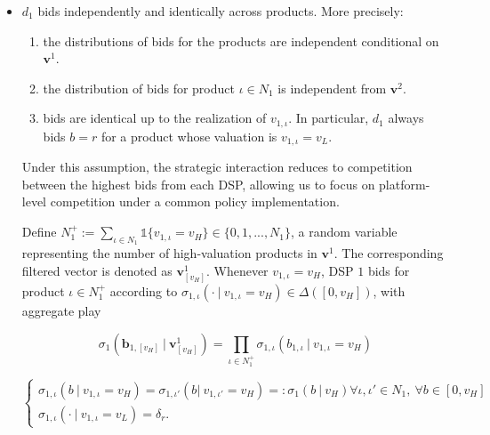 \begin{itemize}
    \item $ d_1 $ bids independently and identically across products. More precisely:

    \begin{enumerate}[(1)]

        \item the distributions of bids for the products are independent conditional on $ \bm{v}^1 $.

        

        \item the distribution of bids for product $ \iota \in N_1 $ is independent from $ \bm{v}^{2} $.

        

        \item bids are identical up to the realization of $ v_{1,\iota} $. In particular, $ d_1 $ always bids $ b = r $ for a product whose valuation is $ v_{1,\iota} = v_L $.

    \end{enumerate}

    

\noindent Under this assumption, the strategic interaction reduces to competition between the highest bids from each DSP, allowing us to focus on platform-level competition under a common policy implementation.

    

    \noindent Define $N_1^+ := \sum_{\iota \in N_1}\mathbb{1}\{v_{1,\iota} = v_H\} \in \{0, 1, ..., N_1\}$, a random variable representing the number of high-valuation products in $\bm{v}^1$. The corresponding filtered vector is denoted as $\bm{v}^1_{[v_H]}$. Whenever $v_{1,\iota} = v_H$, DSP $ 1 $ bids for product $ \iota \in N_1^+ $ according to $ \sigma_{1,\iota} ( \cdot \ | \ v_{1,\iota} = v_H) \in \Delta([0,v_H]) $, with aggregate play

    \begin{equation*}\tag{I $\cap$ II}\label{indep}
     \sigma_1 \left(\bm{b}_{1, [v_H]}\ \Big| \ \bm{v}^1_{[v_H]}\right) = \prod_{\iota \in N_1^+} \sigma_{1, \iota} (b_{1,\iota}\ | \ v_{1,\iota} = v_H)
    \end{equation*}

    \begin{equation*}\tag{III}\label{ident} 
        \begin{cases}
          \sigma_{1,\iota} (b \ | \ v_{1,\iota} = v_H) = \sigma_{1,\iota'} (b | \ v_{1,\iota'} = v_H) =: \sigma_1 (b \ | \ v_H)   \forall \iota, \iota' \in N_1, \ \forall b \in [0,v_H] \\[5pt]
          \sigma_{1,\iota} ( \cdot \ | \ v_{1,\iota} = v_L) = \delta_r.
        \end{cases}
    \end{equation*}


\end{itemize}
